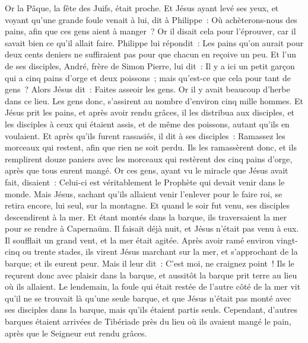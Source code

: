 \begin{multicols}{2}
Or la Pâque, la fête des Juifs, était proche.
Et Jésus ayant levé ses yeux, et voyant qu'une grande foule venait à lui, dit à Philippe~: Où achèterons-nous des pains, afin que ces gens aient à manger~?
Or il disait cela pour l'éprouver, car il savait bien ce qu'il allait faire.
Philippe lui répondit~: Les pains qu'on aurait pour deux cents deniers ne suffiraient pas pour que chacun en reçoive un peu.
Et l'un de ses disciples, André, frère de Simon Pierre, lui dit~:
Il y a ici un petit garçon qui a cinq pains d'orge et deux poissons~; mais qu'est-ce que cela pour tant de gens~?
Alors Jésus dit~: Faites asseoir les gens. Or il y avait beaucoup d'herbe dans ce lieu. Les gens donc, s'assirent au nombre d'environ cinq mille hommes.
Et Jésus prit les pains, et après avoir rendu grâces, il les distribua aux disciples, et les disciples à ceux qui étaient assis, et de même des poissons, autant qu'ils en voulaient.
Et après qu'ils furent rassasiés, il dit à ses disciples~: Ramassez les morceaux qui restent, afin que rien ne soit perdu.
Ils les ramassèrent donc, et ils remplirent douze paniers avec les morceaux qui restèrent des cinq pains d'orge, après que tous eurent mangé.
Or ces gens, ayant vu le miracle que Jésus avait fait, disaient~: Celui-ci est véritablement le Prophète qui devait venir dans le monde.
Mais Jésus, sachant qu'ils allaient venir l'enlever pour le faire roi, se retira encore, lui seul, sur la montagne.
Et quand le soir fut venu, ses disciples descendirent à la mer.
Et étant montés dans la barque, ils traversaient la mer pour se rendre à Capernaüm. Il faisait déjà nuit, et Jésus n'était pas venu à eux.
Il soufflait un grand vent, et la mer était agitée.
Après avoir ramé environ vingt-cinq ou trente stades, ils virent Jésus marchant sur la mer, et s'approchant de la barque; et ils eurent peur.
Mais il leur dit~: C'est moi, ne craignez point~!
Ils le reçurent donc avec plaisir dans la barque, et aussitôt la barque prit terre au lieu où ils allaient.
Le lendemain, la foule qui était restée de l'autre côté de la mer vit qu'il ne se trouvait là qu'une seule barque, et que Jésus n'était pas monté avec ses disciples dans la barque, mais qu'ils étaient partis seuls.
Cependant, d'autres barques étaient arrivées de Tibériade près du lieu où ils avaient mangé le pain, après que le Seigneur eut rendu grâces.

\end{multicols}
